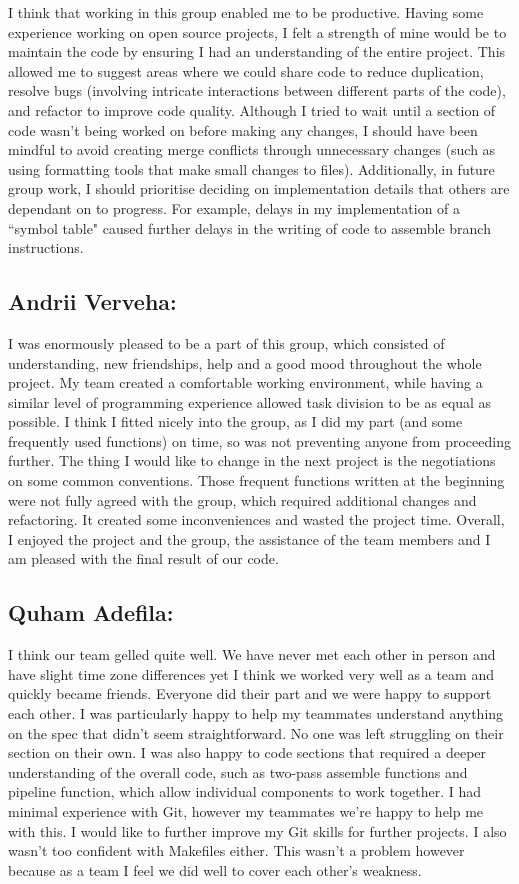 \documentclass[]{article}
\begin{document}
I think that working in this group enabled me to be productive. Having some experience working on open source projects, I felt a strength of mine would be to maintain the code by ensuring I had an understanding of the entire project. This allowed me to suggest areas where we could share code to reduce duplication, resolve bugs (involving intricate interactions between different parts of the code), and refactor to improve code quality. Although I tried to wait until a section of code wasn't being worked on before making any changes, I should have been mindful to avoid creating merge conflicts through unnecessary changes (such as using formatting tools that make small changes to files). Additionally, in future group work, I should prioritise deciding on implementation details that others are dependant on to progress. For example, delays in my implementation of a ``symbol table" caused further delays in the writing of code to assemble branch instructions.

\subsection*{Andrii Verveha:}

I was enormously pleased to be a part of this group, which consisted of understanding, new friendships, help and a good mood throughout the whole project. My team created a comfortable working environment, while having a similar level of programming experience allowed task division to be as equal as possible. I think I fitted nicely into the group, as I did my part (and some frequently used functions) on time, so was not preventing anyone from proceeding further. The thing I would like to change in the next project is the negotiations on some common conventions. Those frequent functions written at the beginning were not fully agreed with the group, which required additional changes and refactoring. It created some inconveniences and wasted the project time. Overall, I enjoyed the project and the group, the assistance of the team members and I am pleased with the final result of our code.

\subsection*{Quham Adefila:}
I think our team gelled quite well. We have never met each other in person and have slight time zone differences yet I think we worked very well as a team and quickly became friends. Everyone did their part and we were happy to support each other. I was particularly happy to help my teammates understand anything on the spec that didn’t seem straightforward. No one was left struggling on their section on their own. I was also happy to code sections that required a deeper understanding of the overall code, such as two-pass assemble functions and pipeline function, which allow individual components to work together. I had minimal experience with Git, however my teammates we’re happy to help me with this. I would like to further improve my Git skills for further projects. I also wasn’t too confident with Makefiles either. This wasn’t a problem however because as a team I feel we did well to cover each other's weakness. 
\end{document}
